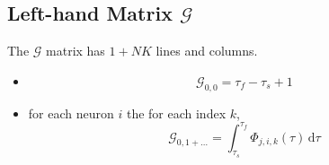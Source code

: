 \documentclass{revtex4}
\begin{document}
\subsection{Left-hand Matrix $\mathcal{G}$}
The $\mathcal{G}$ matrix has $1+NK$ lines and columns.
\begin{itemize}
	\item 
		$$ 
		\mathcal{G}_{0,0} = \tau_f-\tau_s+1
		$$
	\item for each neuron $i$ the for each index $k$,
		$$
			\mathcal{G}_{0,1+\ldots} =  \int_{\tau_s}^{\tau_f} \Phi_{j,i,k}(\tau) \, \mathrm{d}\tau
		$$
	
	
\end{itemize}
\end{document}
